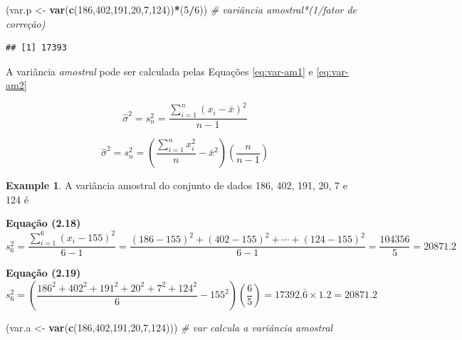 \documentclass[
]{book}
\newenvironment{Shaded}{\begin{snugshade}}{\end{snugshade}}
\newcommand{\CommentTok}[1]{\textcolor[rgb]{0.56,0.35,0.01}{\textit{#1}}}
\newcommand{\DecValTok}[1]{\textcolor[rgb]{0.00,0.00,0.81}{#1}}
\newcommand{\KeywordTok}[1]{\textcolor[rgb]{0.13,0.29,0.53}{\textbf{#1}}}
\newcommand{\NormalTok}[1]{#1}
\newcommand{\OperatorTok}[1]{\textcolor[rgb]{0.81,0.36,0.00}{\textbf{#1}}}
\newcommand{\StringTok}[1]{\textcolor[rgb]{0.31,0.60,0.02}{#1}}
\theoremstyle{definition}
\theoremstyle{definition}
\newtheorem{example}{Example}[chapter]
\theoremstyle{definition}
\theoremstyle{remark}
\begin{document}
\begin{Shaded}
\begin{Highlighting}[]
\NormalTok{(var.p \textless{}{-}}\StringTok{ }\KeywordTok{var}\NormalTok{(}\KeywordTok{c}\NormalTok{(}\DecValTok{186}\NormalTok{,}\DecValTok{402}\NormalTok{,}\DecValTok{191}\NormalTok{,}\DecValTok{20}\NormalTok{,}\DecValTok{7}\NormalTok{,}\DecValTok{124}\NormalTok{))}\OperatorTok{*}\NormalTok{(}\DecValTok{5}\OperatorTok{/}\DecValTok{6}\NormalTok{))   }\CommentTok{\# variância amostral*(1/fator de correção)}
\end{Highlighting}
\end{Shaded}

\begin{verbatim}
## [1] 17393
\end{verbatim}

A variância \emph{amostral} pode ser calculada pelas Equações \eqref{eq:var-am1} e \eqref{eq:var-am2}

\begin{equation}
\hat{\sigma}^2 = s_{n}^2 = \frac{\sum_{i=1}^n (x_i - \bar{x})^2}{n-1}
\label{eq:var-am1}
\end{equation}

\begin{equation}
\hat{\sigma}^2 = s_{n}^2 = \left( \frac{\sum_{i=1}^n x_{i}^2}{n} - \bar{x}^2 \right) \left( \frac{n}{n-1} \right) 
\label{eq:var-am2}
\end{equation}

\begin{example}
\protect\hypertarget{exm:var-am-descr}{}{\label{exm:var-am-descr} }A variância amostral do conjunto de dados 186, 402, 191, 20, 7 e 124 é\\
\end{example}

\textbf{Equação (2.18)} \[s_{6}^2 = \frac{\sum_{i=1}^6 (x_i - 155)^2}{6-1} = \frac{(186-155)^2+(402-155)^2+ \cdots + (124-155)^2}{6-1} = \frac{104356}{5} = 20871.2\]

\textbf{Equação (2.19)} \[s_{6}^2 = \left( \frac{186^2+402^2+191^2+20^2+7^2+124^2}{6} - 155^2 \right) \left( \frac{6}{5} \right) = 17392.\bar{6} \times 1.2 = 20871.2\]

\begin{Shaded}
\begin{Highlighting}[]
\NormalTok{(var.a \textless{}{-}}\StringTok{ }\KeywordTok{var}\NormalTok{(}\KeywordTok{c}\NormalTok{(}\DecValTok{186}\NormalTok{,}\DecValTok{402}\NormalTok{,}\DecValTok{191}\NormalTok{,}\DecValTok{20}\NormalTok{,}\DecValTok{7}\NormalTok{,}\DecValTok{124}\NormalTok{)))     }\CommentTok{\# \textquotesingle{}var\textquotesingle{} calcula a variância amostral}
\end{Highlighting}
\end{Shaded}
\end{document}
